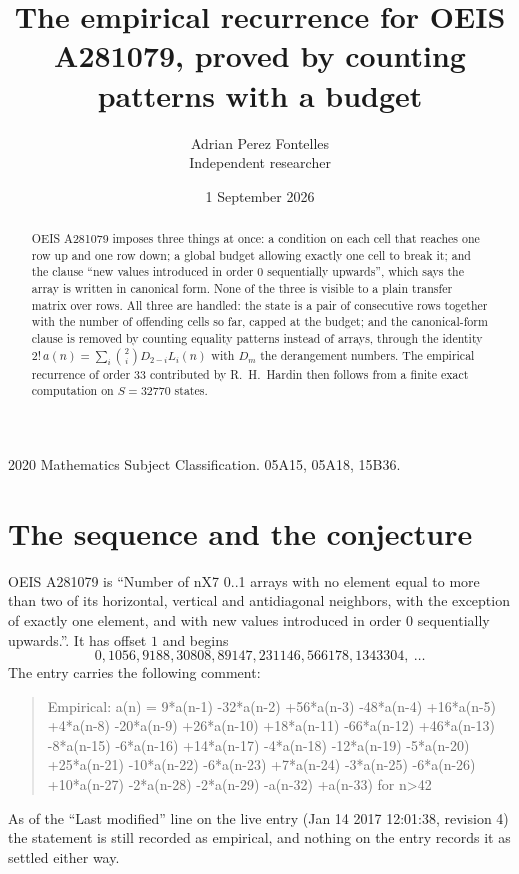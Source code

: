 \documentclass[11pt,a4paper]{article}
\title{The empirical recurrence for OEIS A281079, proved by counting patterns with a budget}
\author{Adrian Perez Fontelles\\ \small Independent researcher}
\date{1 September 2026}
\theoremstyle{plain}
\theoremstyle{definition}
\begin{document}
\maketitle

\begin{abstract}
OEIS A281079 imposes three things at once: a condition on each cell that reaches one row up and
one row down; a global budget allowing exactly one cell to
break it; and the clause ``new values introduced in order $0$ sequentially upwards'', which
says the array is written in canonical form. None of the three is visible to a plain transfer
matrix over rows. All three are handled: the state is a pair of consecutive rows
together with the number of offending cells so far, capped at the budget; and the
canonical-form clause is removed by counting equality patterns instead of arrays, through the
identity $2!\,a(n)=\sum_i\binom{2}{i}D_{2-i}L_i(n)$ with $D_m$ the derangement
numbers. The empirical recurrence of order $33$ contributed by R.~H.~Hardin then follows
from a finite exact computation on $S=32770$ states.
\end{abstract}

\noindent\small 2020 Mathematics Subject Classification. 05A15, 05A18, 15B36.\normalsize

\section{The sequence and the conjecture}

OEIS A281079 is ``Number of nX7 0..1 arrays with no element equal to more than two of its horizontal, vertical and antidiagonal neighbors, with the exception of exactly one element, and with new values introduced in order 0 sequentially upwards.''. It has offset $1$ and begins
\[
0, 1056, 9188, 30808, 89147, 231146, 566178, 1343304,\ \dots
\]
The entry carries the following comment:
\begin{quote}\small
Empirical: a(n) = 9*a(n-1) -32*a(n-2) +56*a(n-3) -48*a(n-4) +16*a(n-5) +4*a(n-8) -20*a(n-9) +26*a(n-10) +18*a(n-11) -66*a(n-12) +46*a(n-13) -8*a(n-15) -6*a(n-16) +14*a(n-17) -4*a(n-18) -12*a(n-19) -5*a(n-20) +25*a(n-21) -10*a(n-22) -6*a(n-23) +7*a(n-24) -3*a(n-25) -6*a(n-26) +10*a(n-27) -2*a(n-28) -2*a(n-29) -a(n-32) +a(n-33) for n>42
\end{quote}
As of the ``Last modified'' line on the live entry (Jan 14 2017 12:01:38, revision 4) the statement is
still recorded as empirical, and nothing on the entry records it as settled either way.
\end{document}
